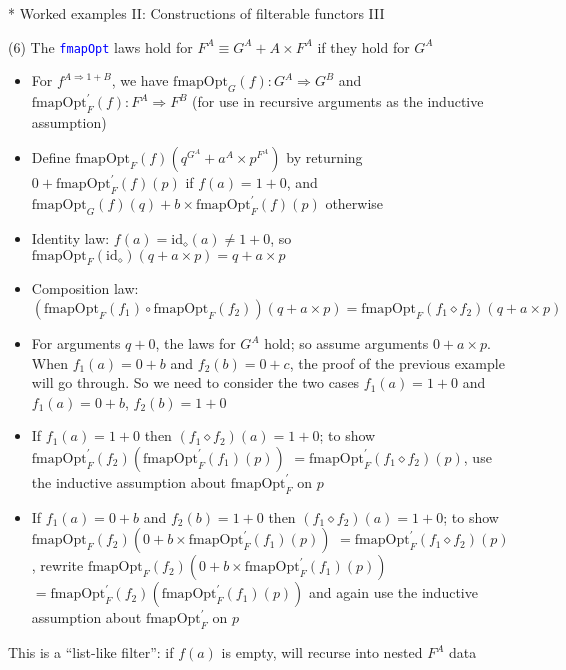 \documentclass[english]{beamer}
\begin{document}
\begin{frame}{{*} Worked examples II: Constructions of filterable functors III}

(6) The \texttt{\textcolor{blue}{\footnotesize{}fmapOpt}} laws hold
for $F^{A}\equiv G^{A}+A\times F^{A}$ if they hold for $G^{A}$
\begin{itemize}
\item {\footnotesize{}For $f^{A\Rightarrow1+B}$, we have $\text{fmapOpt}_{G}(f):G^{A}\Rightarrow G^{B}$
and $\text{fmapOpt}_{F}^{\prime}(f):F^{A}\Rightarrow F^{B}$ (for
use in recursive arguments as the inductive assumption)}{\footnotesize \par}
\item {\footnotesize{}Define $\text{fmapOpt}_{F}(f)(q^{G^{A}}+a^{A}\times p^{F^{A}})$
by returning $0+\text{fmapOpt}_{F}^{\prime}(f)(p)$ if $f(a)=1+0$,
and $\text{fmapOpt}_{G}(f)(q)+b\times\text{fmapOpt}_{F}^{\prime}(f)(p)$
otherwise}{\footnotesize \par}
\item Identity law: {\footnotesize{}$f(a)=\text{id}_{\diamond}(a)\neq1+0$},
so {\footnotesize{}$\text{fmapOpt}_{F}(\text{id}_{\diamond})(q+a\times p)=q+a\times p$ }{\footnotesize \par}
\item Composition law: {\footnotesize{}$(\text{fmapOpt}_{F}(f_{1})\circ\text{fmapOpt}_{F}(f_{2}))(q+a\times p)=\text{fmapOpt}_{F}(f_{1}\diamond f_{2})(q+a\times p)$}{\footnotesize \par}
\item {\footnotesize{}For arguments $q+0$, the laws for $G^{A}$ hold;
so assume arguments $0+a\times p$. When $f_{1}(a)=0+b$ and $f_{2}(b)=0+c$,
the proof of the previous example will go through. So we need to consider
the two cases $f_{1}(a)=1+0$ and $f_{1}(a)=0+b$, $f_{2}(b)=1+0$ }{\footnotesize \par}
\item {\footnotesize{}If $f_{1}(a)=1+0$ then $(f_{1}\diamond f_{2})(a)=1+0$;
to show $\text{fmapOpt}_{F}^{\prime}(f_{2})(\text{fmapOpt}_{F}^{\prime}(f_{1})(p))$
$=\text{fmapOpt}_{F}^{\prime}(f_{1}\diamond f_{2})(p)$, use the inductive
assumption about $\text{fmapOpt}_{F}^{\prime}$ on $p$}{\footnotesize \par}
\item {\footnotesize{}If $f_{1}(a)=0+b$ and $f_{2}(b)=1+0$ then $(f_{1}\diamond f_{2})(a)=1+0$;
to show $\text{fmapOpt}_{F}(f_{2})(0+b\times\text{fmapOpt}_{F}^{\prime}(f_{1})(p))$
$=\text{fmapOpt}_{F}^{\prime}(f_{1}\diamond f_{2})(p)$, rewrite $\text{fmapOpt}_{F}(f_{2})(0+b\times\text{fmapOpt}_{F}^{\prime}(f_{1})(p))$
$=\text{fmapOpt}_{F}^{\prime}(f_{2})(\text{fmapOpt}_{F}^{\prime}(f_{1})(p))$
and again use the inductive assumption about $\text{fmapOpt}_{F}^{\prime}$
on $p$}{\footnotesize \par}
\end{itemize}
This is a ``list-like filter'': if $f(a)$ is empty, will recurse
into nested $F^{A}$ data
\end{frame}
\end{document}
